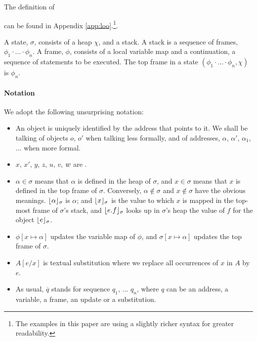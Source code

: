  The definition of \LangOO~ {can be found in   {Appendix \ref{app:loo}.}\footnote{{{The examples in this paper are using  a slightly richer syntax for greater readability.}}}.
 
A \LangOO state, $\sigma$,  consists of a  heap $\chi$, and a   stack. 
{A stack  is a sequence of frames, $\phi_1\!\cdot\!...\!\cdot\! \phi_n$.}
A  frame, $\phi$, consists of a local variable map and a continuation, \ie a sequence of statements to be executed.
The top frame in a state $(\phi_1\!\cdot\!...\!\cdot\! \phi_n, \chi)$ is $\phi_n$. 


 
\paragraph{Notation} We adopt the following unsurprising notation:
\label{s:notation}
\begin{itemize}
\item
{An object is uniquely identified by the address that points to it. We shall be talking of objects $o$, $o'$ when talking less formally, and of addresses, $\alpha$, $\alpha'$, $\alpha_1$, ...  when more formal.}
\item
$x$, $x'$, $y$, $z$, $u$, $v$, $w$  are . 
\item
$\alpha \in \sigma$ means that $\alpha$ is defined in the heap of $\sigma$, and $x\in \sigma$ means that $x$ is defined in the top frame of $\sigma$.
Conversely,  $\alpha\notin\sigma$ and $x\notin\sigma$ %
 have the obvious meanings.
$\lfloor \alpha \rfloor_{\sigma}$  is $\alpha$; and $\lfloor x \rfloor_{\sigma}$  is the value to which  $x$  is mapped in the top-most frame of $\sigma$'s stack, 
and $\lfloor e.f \rfloor_{\sigma}$ looks up in $\sigma$'s heap the value of $f$ for the object  $\lfloor e \rfloor_{\sigma}$.
\item %
$\phi[x \mapsto \alpha]$ updates  the variable map  of $\phi$,  
and  $\sigma[x \mapsto \alpha]$ updates the top frame of $\sigma$.
\item
$A[e/x]$ is textual substitution where we replace all occurrences of $x$ in $A$ by $e.$ 
\item
As usual, $\overline q$ stands for  sequence $q_1$, ... $q_n$, where $q$ can be an address, a variable,    a frame, an update or a substitution.

\end{itemize}}
